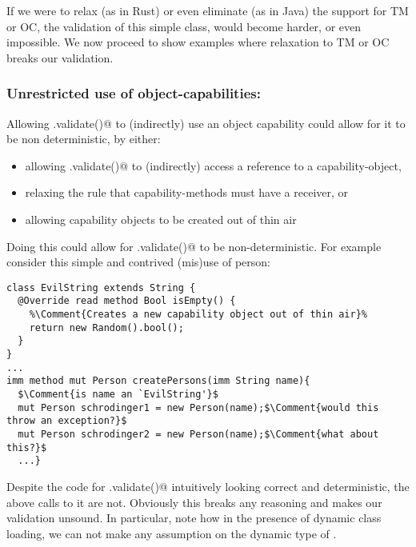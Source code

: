
If we were to relax (as in Rust) or even eliminate (as in Java) the support for TM or OC, the validation of this simple \Q@Person@ class, would become harder, or even impossible. We now proceed to show examples where
relaxation to TM or OC breaks our validation. 
\subsubsection*{Unrestricted use of object-capabilities:}
Allowing \Q@.validate()@ to (indirectly) use an object capability could allow for it to be non deterministic, by either:
\begin{itemize}
\item allowing \Q@.validate()@ to (indirectly) access a \Q@mut@ reference to a capability-object,
\item relaxing the rule that capability-methods must have a \Q@mut@ receiver, or
\item allowing capability objects to be created out of thin air
\end{itemize}

Doing this could allow for \Q@.validate()@ to be non-deterministic. For example consider this simple and contrived (mis)use of person:
\begin{lstlisting}[escapechar=\%]
class EvilString extends String {
  @Override read method Bool isEmpty() {
    %\Comment{Creates a new capability object out of thin air}%
    return new Random().bool();
  }
}
...
imm method mut Person createPersons(imm String name){
  $\Comment{is name an `EvilString'}$
  mut Person schrodinger1 = new Person(name);$\Comment{would this throw an exception?}$
  mut Person schrodinger2 = new Person(name);$\Comment{what about this?}$
  ...}
\end{lstlisting}
Despite the code for \Q@Persion.validate()@ intuitively looking correct and deterministic, the above calls to it are not. Obviously this breaks any reasoning and makes our validation unsound. 
In particular, note how in the presence of dynamic class loading, 
we can not make any assumption on the dynamic type of \Q@name@.

